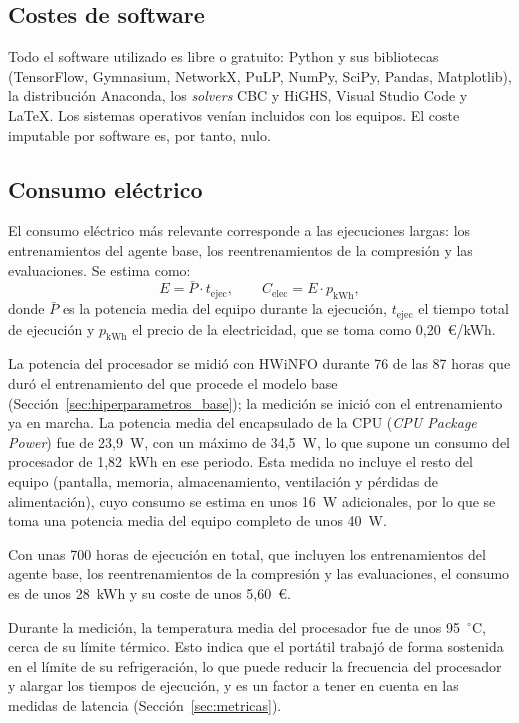 \subsection{Costes de software}

Todo el software utilizado es libre o gratuito: Python y sus bibliotecas (TensorFlow, Gymnasium, NetworkX, PuLP, NumPy, SciPy, Pandas, Matplotlib), la distribución Anaconda, los \textit{solvers} CBC y HiGHS, Visual Studio Code y \LaTeX{}. Los sistemas operativos venían incluidos con los equipos. El coste imputable por software es, por tanto, nulo.

\subsection{Consumo eléctrico}\label{sec:costes_energia}

El consumo eléctrico más relevante corresponde a las ejecuciones largas: los entrenamientos del agente base, los reentrenamientos de la compresión y las evaluaciones. Se estima como:
\begin{equation}\label{eq:energia_proyecto}
	E = \bar{P} \cdot t_{\text{ejec}}, \qquad C_{\text{elec}} = E \cdot p_{\text{kWh}},
\end{equation}
donde $\bar{P}$ es la potencia media del equipo durante la ejecución, $t_{\text{ejec}}$ el tiempo total de ejecución y $p_{\text{kWh}}$ el precio de la electricidad, que se toma como 0,20~€/kWh.

La potencia del procesador se midió con HWiNFO durante 76 de las 87 horas que duró el entrenamiento del que procede el modelo base (Sección~\ref{sec:hiperparametros_base}); la medición se inició con el entrenamiento ya en marcha. La potencia media del encapsulado de la CPU (\textit{CPU Package Power}) fue de 23,9~W, con un máximo de 34,5~W, lo que supone un consumo del procesador de 1,82~kWh en ese periodo. Esta medida no incluye el resto del equipo (pantalla, memoria, almacenamiento, ventilación y pérdidas de alimentación), cuyo consumo se estima en unos 16~W adicionales, por lo que se toma una potencia media del equipo completo de unos 40~W.

Con unas 700 horas de ejecución en total, que incluyen los entrenamientos del agente base, los reentrenamientos de la compresión y las evaluaciones, el consumo es de unos 28~kWh y su coste de unos 5,60~€.

Durante la medición, la temperatura media del procesador fue de unos 95~$^\circ$C, cerca de su límite térmico. Esto indica que el portátil trabajó de forma sostenida en el límite de su refrigeración, lo que puede reducir la frecuencia del procesador y alargar los tiempos de ejecución, y es un factor a tener en cuenta en las medidas de latencia (Sección~\ref{sec:metricas}).

